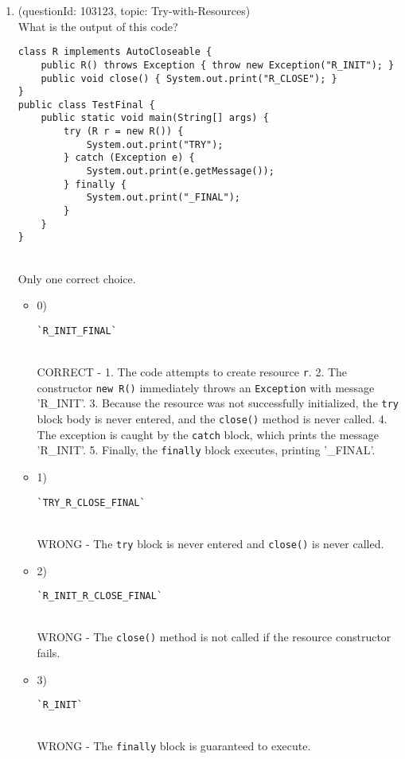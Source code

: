\documentclass[12pt]{article}
\begin{document}
\begin{enumerate}[label=(\arabic*)]
\begin{itemize}
\end{itemize}
\item (questionId: 103123, topic: Try-with-Resources) \\ 
What is the output of this code?
\begin{verbatim}
class R implements AutoCloseable {
    public R() throws Exception { throw new Exception("R_INIT"); }
    public void close() { System.out.print("R_CLOSE"); }
}
public class TestFinal {
    public static void main(String[] args) {
        try (R r = new R()) {
            System.out.print("TRY");
        } catch (Exception e) {
            System.out.print(e.getMessage());
        } finally {
            System.out.print("_FINAL");
        }
    }
}
\end{verbatim}
\\ \noindent Only one correct choice. 
\begin{itemize}
\item 0) \begin{verbatim}`R_INIT_FINAL`\end{verbatim}
 \\ 
CORRECT - 1. The code attempts to create resource \verb|r|. 2. The constructor \verb|new R()| immediately throws an \verb|Exception| with message 'R_INIT'. 3. Because the resource was not successfully initialized, the \verb|try| block body is never entered, and the \verb|close()| method is never called. 4. The exception is caught by the \verb|catch| block, which prints the message 'R_INIT'. 5. Finally, the \verb|finally| block executes, printing '_FINAL'.

\item 1) \begin{verbatim}`TRY_R_CLOSE_FINAL`\end{verbatim}
 \\ 
WRONG - The \verb|try| block is never entered and \verb|close()| is never called.

\item 2) \begin{verbatim}`R_INIT_R_CLOSE_FINAL`\end{verbatim}
 \\ 
WRONG - The \verb|close()| method is not called if the resource constructor fails.

\item 3) \begin{verbatim}`R_INIT`\end{verbatim}
 \\ 
WRONG - The \verb|finally| block is guaranteed to execute.


\end{itemize}
\end{enumerate}
\end{document}
